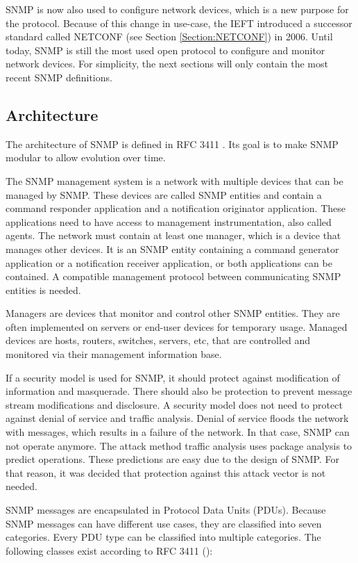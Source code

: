 SNMP is now also used to configure network devices, which is a new purpose for the protocol. Because of this change in use-case, the IEFT introduced a successor standard called NETCONF (see Section \ref{Section:NETCONF}) in 2006. 
Until today, SNMP is still the most used open protocol to configure and monitor network devices. For simplicity, the next sections will only contain the most recent SNMP definitions.

\subsection{Architecture}
The architecture of SNMP is defined in RFC 3411 \cite{RFC:RFC3411:2002}. Its goal is to make SNMP modular to allow evolution over time.

The SNMP management system is a network with multiple devices that can be managed by SNMP. These devices are called SNMP entities and contain a command responder application and a notification originator application. These applications need to have access to management instrumentation, also called agents. The network must contain at least one manager, which is a device that manages other devices. It is an SNMP entity containing a command generator application or a notification receiver application, or both applications can be contained. A compatible management protocol between communicating SNMP entities is needed.

Managers are devices that monitor and control other SNMP entities. They are often implemented on servers or end-user devices for temporary usage. Managed devices are hosts, routers, switches, servers, etc, that are controlled and monitored via their management information base.

\newpage
If a security model is used for SNMP, it should protect against modification of information and masquerade. There should also be protection to prevent message stream modifications and disclosure. A security model does not need to protect against denial of service and traffic analysis. Denial of service floods the network with messages, which results in a failure of the network. In that case, SNMP can not operate anymore. The attack method traffic analysis uses package analysis to predict operations. These predictions are easy due to the design of SNMP. For that reason, it was decided that protection against this attack vector is not needed.

SNMP messages are encapsulated in Protocol Data Units (PDUs). Because SNMP messages can have different use cases, they are classified into seven categories. Every PDU type can be classified into multiple categories. The following classes exist according to RFC 3411 (\cite{RFC:RFC3411:2002}):

